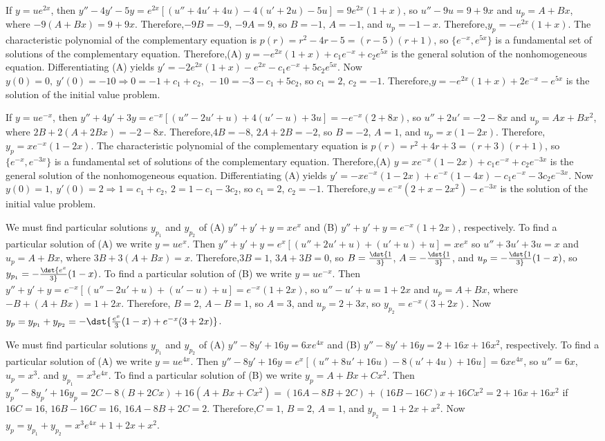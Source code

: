 \documentclass[dvips]{book}
\renewcommand{\exer}[1]{\par\medskip\;\noindent{\color{red}\bf #1.}}
\numberwithin{example}{section}
\numberwithin{equation}{section}
\numberwithin{theorem}{section}
\numberwithin{table}{section}
\numberwithin{figure}{section}
\begin{document}
\exer{5.4.20}
If $y=ue^{2x}$, then
$y''-4y'-5y=e^{2x}\left[(u''+4u'+4u)-4(u'+2u)-5u\right]=
9e^{2x}(1+x)$, so $u''-9u =9+9x$ and $u_p=A+Bx$, where
$-9(A+Bx)=9+9x$. Therefore,$-9B=-9$, $-9A=9$, so $B=-1$, $A=-1$, and
$u_p=-1-x$. Therefore,$y_p=-e^{2x}(1+x)$. The characteristic
polynomial of the complementary equation is
$p(r)=r^2-4r-5=(r-5)(r+1)$, so $\{e^{-x},e^{5x}\}$ is a fundamental
set of solutions of the complementary equation. Therefore,(A)
$y=-e^{2x}(1+x)+c_1e^{-x}+c_2e^{5x}$ is the general solution of the
nonhomogeneous equation. Differentiating (A) yields
$y'=-2e^{2x}(1+x)-e^{2x}-c_1e^{-x}+5c_2e^{5x}$. Now $y(0)=0,\
y'(0)=-10\Rightarrow 0=-1+c_1+c_2,\ -10=-3-c_1+5c_2$, so $c_1=2$,
$c_2=-1$. Therefore,$y=-e^{2x}(1+x)+2e^{-x}-e^{5x}$ is the solution of
the initial value problem.


\exer{5.4.22}
If $y=ue^{-x}$, then
$y''+4y'+3y=e^{-x}\left[(u''-2u'+u)+4(u'-u)+3u\right]= -e^{-x}(2+8x)$,
so $u''+2u'=-2-8x$ and $u_p=Ax+Bx^2$, where $2B+2(A+2Bx)=-2-8x$.
Therefore,$4B=-8$, $2A+2B=-2$, so $B=-2$, $A=1$, and $u_p=x(1-2x)$.
Therefore,$y_p=xe^{-x}(1-2x)$. The characteristic polynomial of the
complementary equation is $p(r)=r^2+4r+3=(r+3)(r+1)$, so
$\{e^{-x},e^{-3x}\}$ is a fundamental set of solutions of the
complementary equation. Therefore,(A)
$y=xe^{-x}(1-2x)+c_1e^{-x}+c_2e^{-3x}$ is the general solution of the
nonhomogeneous equation. Differentiating (A) yields
$y'=-xe^{-x}(1-2x)+e^{-x}(1-4x)-c_1e^{-x}-3c_2e^{-3x}$. Now $y(0)=1,\
y'(0)=2\Rightarrow 1=c_1+c_2,\ 2=1-c_1-3c_2$, so $c_1=2$, $c_2=-1$.
Therefore,$y=e^{-x}(2+x-2x^2)-e^{-3x}$ is the solution of the initial
value problem.


\exer{5.4.24}
We must find particular solutions $y_{p_1}$ and $y_{p_2}$ of (A)
$y''+y'+y=xe^x$ and (B) $y''+y'+y=e^{-x}(1+2x)$, respectively. To find
a particular solution of (A) we write $y=ue^x$. Then
$y''+y'+y=e^x\left[(u''+2u'+u)+(u'+u)+u\right]= xe^x$ so $u''+3u'+3u
=x$ and $u_p=A+Bx$, where $3B+3(A+Bx)=x$. Therefore,$3B=1$, $3A+3B=0$,
so $B=\dst{1\over3}$, $A=-\dst{1\over3}$, and $u_p=-\dst{1\over3}(1-x)
$, so $y_{p_1}=-\dst{e^x\over3}(1-x)$. To find a particular solution
of (B) we write $y=ue^{-x}$. Then
$y''+y'+y=e^{-x}\left[(u''-2u'+u)+(u'-u)+u\right]= e^{-x}(1+2x)$, so
$u''-u'+u =1+2x$ and $u_p=A+Bx$, where $-B+(A+Bx)=1+2x$. Therefore,
$B=2$, $A-B=1$, so $A=3$, and $u_p=2+3x$, so $y_{p_2}=e^{-x}(3+2x)$.
Now $y_p=y_{p_1}+y_{p_2}=-\dst{{e^x\over3}(1-x)+e^{-x}(3+2x)}$.


\exer{5.4.26}
We must find particular solutions $y_{p_1}$ and $y_{p_2}$ of (A)
$y''-8y'+16y=6xe^{4x}$ and (B) $y''-8y'+16y=2+16x+16x^2$,
respectively. To find a particular solution of (A) we write
$y=ue^{4x}$. Then
$y''-8y'+16y=e^x\left[(u''+8u'+16u)-8(u'+4u)+16u\right]= 6xe^{4x}$, so
$u'' =6x$, $u_p=x^3$. and $y_{p_1}=x^3e^{4x}$. To find a particular
solution of (B) we write $y_p=A+Bx+Cx^2$. Then
$y_p''-8y_p'+16y_p=2C-8(B+2Cx)+16(A+Bx+Cx^2)=(16A-8B+2C)
+(16B-16C)x+16Cx^2=2+16x+16x^2$ if $16C=16$, $16B-16C=16$,
$16A-8B+2C=2$. Therefore,$C=1$, $B=2$, $A=1$, and $y_{p_2}=1+2x+x^2$.
Now $y_p=y_{p_1}+y_{p_2}=x^3e^{4x}+1+2x+x^2$.
\end{document}
